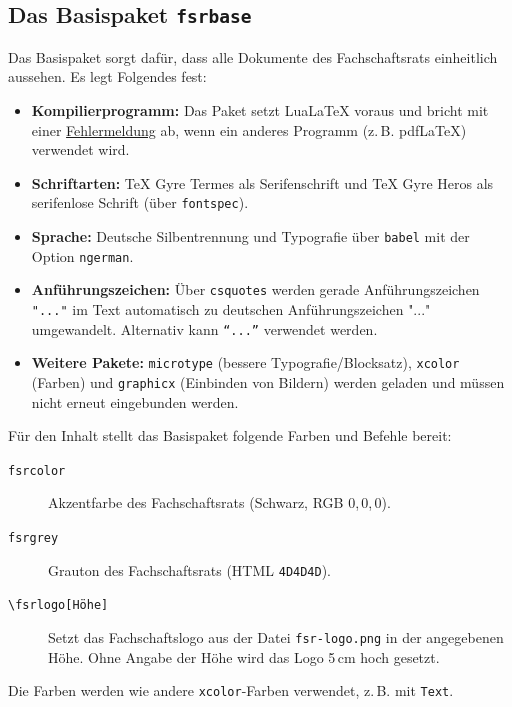 \subsection{Das Basispaket \texttt{fsrbase}}
\label{latex-fsrbase}
Das Basispaket sorgt dafür, dass alle Dokumente des Fachschaftsrats einheitlich aussehen. Es legt Folgendes fest:
\begin{itemize}
	\item \textbf{Kompilierprogramm:} Das Paket setzt LuaLaTeX voraus und bricht mit einer \hyperref[latex-fehlermeldungen]{Fehlermeldung} ab, wenn ein anderes Programm (z.\,B. pdfLaTeX) verwendet wird.
	\item \textbf{Schriftarten:} TeX Gyre Termes als Serifenschrift und TeX Gyre Heros als serifenlose Schrift (über \texttt{fontspec}).
	\item \textbf{Sprache:} Deutsche Silbentrennung und Typografie über \texttt{babel} mit der Option \texttt{ngerman}.
	\item \textbf{Anführungszeichen:} Über \texttt{csquotes} werden gerade Anführungszeichen \texttt{\string"...\string"} im Text automatisch zu deutschen Anführungszeichen "..." umgewandelt. Alternativ kann \texttt{\enquote{...}} verwendet werden.
	\item \textbf{Weitere Pakete:} \texttt{microtype} (bessere Typografie/Blocksatz), \texttt{xcolor} (Farben) und \texttt{graphicx} (Einbinden von Bildern) werden geladen und müssen nicht erneut eingebunden werden.
\end{itemize}

Für den Inhalt stellt das Basispaket folgende Farben und Befehle bereit:
\begin{description}
	\item[\texttt{fsrcolor}] Akzentfarbe des Fachschaftsrats (Schwarz, RGB 0,\,0,\,0).
	\item[\texttt{fsrgrey}] Grauton des Fachschaftsrats (HTML \texttt{4D4D4D}).
	\item[{\texttt{\textbackslash fsrlogo[Höhe]}}] Setzt das Fachschaftslogo aus der Datei \texttt{fsr-logo.png} in der angegebenen Höhe. Ohne Angabe der Höhe wird das Logo 5\,cm hoch gesetzt.
\end{description}

Die Farben werden wie andere \texttt{xcolor}-Farben verwendet, z.\,B. mit \texttt{\textcolor{fsrgrey}{Text}}.
